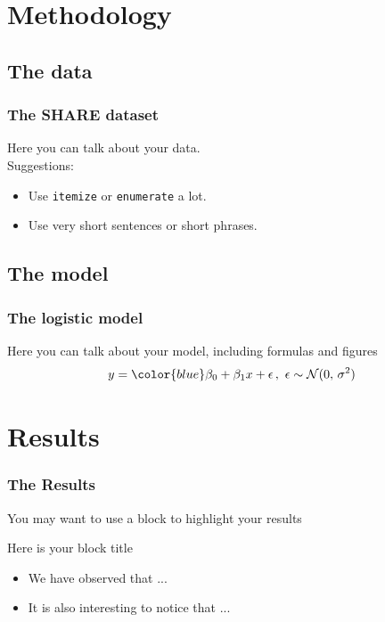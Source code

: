 \documentclass[11pt]{beamer}
\begin{document}
\section{Methodology}   %

\subsection{The data}   %

\begin{frame}          %
\frametitle{The SHARE dataset}
Here you can talk about your data. \\
\bigskip
Suggestions:
\begin{itemize}
	\item 
	Use \texttt{itemize} or \texttt{enumerate} a lot.
	\bigskip
	\item
	Use very short sentences or short phrases.
\end{itemize}
\end{frame}

\subsection{The model}    %

\begin{frame}          %
\frametitle{The logistic model}
Here you can talk about your model, including formulas and figures
\bigskip
\begin{equation}          
y = {\color{blue}\beta_0} + \beta_1x + \epsilon\,,\,\,
\epsilon \sim \mathcal{N}(0,\,\sigma^{2})
\end{equation}

\end{frame}

\section{Results}   %

\begin{frame}          %
\frametitle{The Results}
You may want to use a block to highlight your results 
\bigskip
\begin{block}{Here is your block title}
		\begin{itemize}
		\item<1-> We have observed that ...
		\item<2-> It is also interesting to notice that ...  
	\end{itemize}
	
\end{block}
\end{frame}
\end{document}
